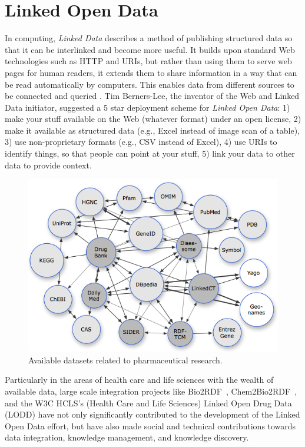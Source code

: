 \documentclass[conference]{IEEEtran}
\begin{document}
\section{Linked Open Data}
\label{sec:lod}
In computing, \emph{Linked Data} describes a method of publishing structured data so that it can be interlinked and become more useful.
It builds upon standard Web technologies such as HTTP and URIs, but rather than using them to serve web pages for human readers, it extends them to share information in a way that can be read automatically by computers.
This enables data from different sources to be connected and queried \cite{linkeddata}.
Tim Berners-Lee, the inventor of the Web and Linked Data initiator, suggested a 5 star deployment scheme for \emph{Linked Open Data}:
1) make your stuff available on the Web (whatever format) under an open license,
2) make it available as structured data (e.g., Excel instead of image scan of a table),
3) use non-proprietary formats (e.g., CSV instead of Excel),
4) use URIs to identify things, so that people can point at your stuff,
5) link your data to other data to provide context.

\begin{figure}[tb]
	\centering
		\includegraphics[width=1.0\columnwidth]{../images/lod_cloud.png}
	\caption{Available datasets related to pharmaceutical research.}
	\label{fig:lod}
\end{figure}

Particularly in the areas of health care and life sciences with the wealth of available data, large scale integration projects like Bio2RDF~\cite{bio2rdf}, Chem2Bio2RDF~\cite{chembio}, and the W3C HCLS’s (Health Care and Life Sciences) Linked Open Drug Data (LODD)\cite{lodd} have not only significantly contributed to the development of the Linked Open Data effort, but have also made social and technical contributions towards data integration, knowledge management, and knowledge discovery.
\end{document}
